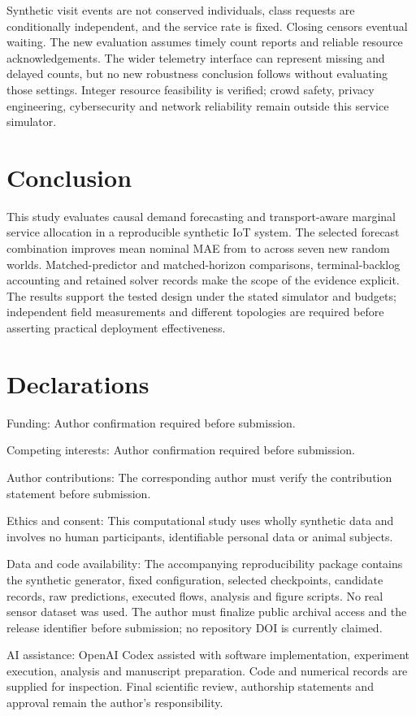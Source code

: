 Synthetic visit events are not conserved individuals, class requests are conditionally independent, and the service rate is fixed. Closing censors eventual waiting. The new evaluation assumes timely count reports and reliable resource acknowledgements. The wider telemetry interface can represent missing and delayed counts, but no new robustness conclusion follows without evaluating those settings. Integer resource feasibility is verified; crowd safety, privacy engineering, cybersecurity and network reliability remain outside this service simulator.

\section{Conclusion}
This study evaluates causal demand forecasting and transport-aware marginal service allocation in a reproducible synthetic IoT system. The selected forecast combination improves mean nominal MAE from \ForecastGWN{} to \ForecastNominal{} across seven new random worlds. \ConclusionControl{} Matched-predictor and matched-horizon comparisons, terminal-backlog accounting and retained solver records make the scope of the evidence explicit. The results support the tested design under the stated simulator and budgets; independent field measurements and different topologies are required before asserting practical deployment effectiveness.

\section*{Declarations}
Funding: Author confirmation required before submission.

Competing interests: Author confirmation required before submission.

Author contributions: The corresponding author must verify the contribution statement before submission.

Ethics and consent: This computational study uses wholly synthetic data and involves no human participants, identifiable personal data or animal subjects.

Data and code availability: The accompanying reproducibility package contains the synthetic generator, fixed configuration, selected checkpoints, candidate records, raw predictions, executed flows, analysis and figure scripts. No real sensor dataset was used. The author must finalize public archival access and the release identifier before submission; no repository DOI is currently claimed.

AI assistance: OpenAI Codex assisted with software implementation, experiment execution, analysis and manuscript preparation. Code and numerical records are supplied for inspection. Final scientific review, authorship statements and approval remain the author's responsibility.
